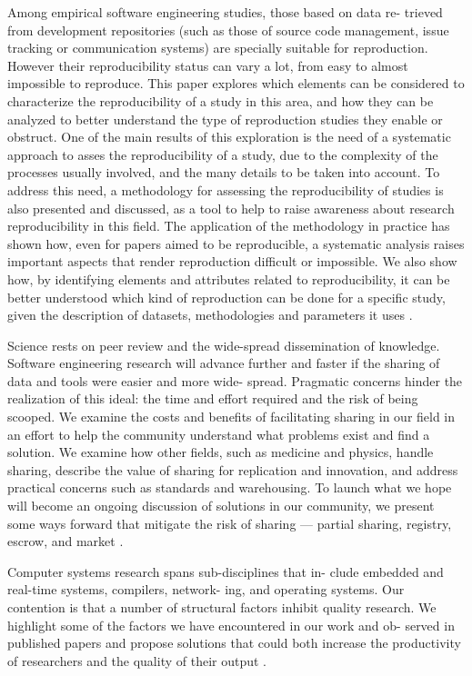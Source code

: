 Among empirical software engineering studies, those based on data re-
trieved from development repositories (such as those of source code management,
issue tracking or communication systems) are specially suitable for reproduction.
However their reproducibility status can vary a lot, from easy to almost impossible
to reproduce. This paper explores which elements can be considered to characterize
the reproducibility of a study in this area, and how they can be analyzed to better
understand the type of reproduction studies they enable or obstruct. One of the
main results of this exploration is the need of a systematic approach to asses the
reproducibility of a study, due to the complexity of the processes usually involved,
and the many details to be taken into account. To address this need, a methodology
for assessing the reproducibility of studies is also presented and discussed, as a tool to
help to raise awareness about research reproducibility in this field. The application
of the methodology in practice has shown how, even for papers aimed to be
reproducible, a systematic analysis raises important aspects that render reproduction
difficult or impossible. We also show how, by identifying elements and attributes
related to reproducibility, it can be better understood which kind of reproduction
can be done for a specific study, given the description of datasets, methodologies and
parameters it uses \cite{gonzalez2012reproducibility}.


Science rests on peer review and the wide-spread dissemination of
knowledge. Software engineering research will advance further and
faster if the sharing of data and tools were easier and more wide-
spread. Pragmatic concerns hinder the realization of this ideal: the
time and effort required and the risk of being scooped. We examine
the costs and benefits of facilitating sharing in our field in an effort
to help the community understand what problems exist and find
a solution. We examine how other fields, such as medicine and
physics, handle sharing, describe the value of sharing for replication
and innovation, and address practical concerns such as standards
and warehousing. To launch what we hope will become an ongoing
discussion of solutions in our community, we present some ways
forward that mitigate the risk of sharing — partial sharing, registry,
escrow, and market \cite{barr2010shoulders}.

Computer systems research spans sub-disciplines that in-
clude embedded and real-time systems, compilers, network-
ing, and operating systems. Our contention is that a number
of structural factors inhibit quality research. We highlight
some of the factors we have encountered in our work and ob-
served in published papers and propose solutions that could
both increase the productivity of researchers and the quality
of their output \cite{Vitek2011}.

